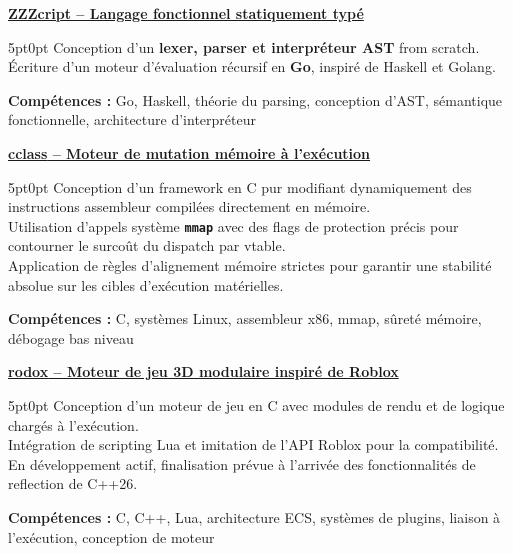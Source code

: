\documentclass[9pt]{extarticle}
\begin{document}
\par\vspace{8pt}

\underline{\bfseries \href{https://github.com/paulogarithm/zzzcript}{ZZZcript} -- Langage fonctionnel statiquement typé}
\par
\begin{adjustwidth}{5pt}{0pt}
	Conception d'un {\bfseries lexer, parser et interpréteur AST} from scratch. \\
	Écriture d'un moteur d'évaluation récursif en {\bfseries Go}, inspiré de Haskell et Golang.
\end{adjustwidth}
\par
{\bfseries Compétences :} Go, Haskell, théorie du parsing, conception d'AST, sémantique fonctionnelle, architecture d'interpréteur

\par\vspace{8pt}

\underline{\bfseries \href{https://github.com/paulogarithm/cclass}{cclass} -- Moteur de mutation mémoire à l'exécution}
\par
\begin{adjustwidth}{5pt}{0pt}
    Conception d'un framework en C pur modifiant dynamiquement des instructions assembleur compilées directement en mémoire. \\
    Utilisation d'appels système {\bfseries \texttt{mmap}} avec des flags de protection précis pour contourner le surcoût du dispatch par vtable. \\
    Application de règles d'alignement mémoire strictes pour garantir une stabilité absolue sur les cibles d'exécution matérielles.
\end{adjustwidth}
\par
{\bfseries Compétences :} C, systèmes Linux, assembleur x86, mmap, sûreté mémoire, débogage bas niveau

\par\vspace{8pt}

\underline{\bfseries \href{https://github.com/paulogarithm/blorox}{rodox} -- Moteur de jeu 3D modulaire inspiré de Roblox}
\par
\begin{adjustwidth}{5pt}{0pt}
	Conception d'un moteur de jeu en C avec modules de rendu et de logique chargés à l'exécution. \\
	Intégration de scripting Lua et imitation de l'API Roblox pour la compatibilité. \\
	En développement actif, finalisation prévue à l'arrivée des fonctionnalités de reflection de C++26.
\end{adjustwidth}
\par
{\bfseries Compétences :} C, C++, Lua, architecture ECS, systèmes de plugins, liaison à l'exécution, conception de moteur
\end{document}
